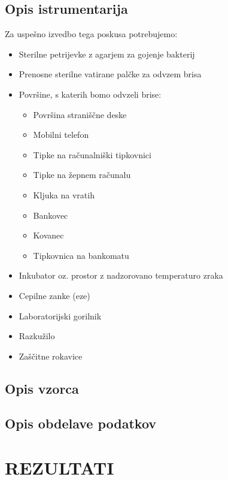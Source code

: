 \documentclass[12pt, a4paper, oneside]{report}
\begin{document}
\subsection{Opis istrumentarija}

Za uspešno izvedbo tega poskusa potrebujemo:
\begin{itemize}
  \item Sterilne petrijevke z agarjem za gojenje bakterij
  \item Prenosne sterilne vatirane palčke za odvzem brisa
  \item Površine, s katerih bomo odvzeli brise:
  \begin{itemize}
    \item Površina straniščne deske
    \item Mobilni telefon
    \item Tipke na računalniški tipkovnici
    \item Tipke na žepnem računalu
    \item Kljuka na vratih
    \item Bankovec
    \item Kovanec
    \item Tipkovnica na bankomatu
  \end{itemize}
  \item Inkubator oz. prostor z nadzorovano temperaturo zraka
  \item Cepilne zanke (eze)
  \item Laboratorijski gorilnik
  \item Razkužilo
  \item Zaščitne rokavice

\end{itemize}

\subsection{Opis vzorca}

\subsection{Opis obdelave podatkov}

\section{REZULTATI}
\end{document}

